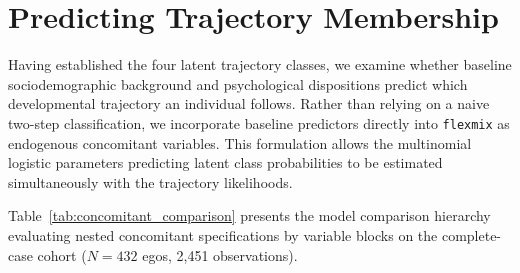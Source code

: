 \documentclass[12pt]{article}
\begin{document}
\section{Predicting Trajectory Membership}

Having established the four latent trajectory classes, we examine whether baseline sociodemographic background and psychological dispositions predict which developmental trajectory an individual follows. Rather than relying on a naive two-step classification, we incorporate baseline predictors directly into \texttt{flexmix} \citep{grun2008flexmix} as endogenous concomitant variables. This formulation allows the multinomial logistic parameters predicting latent class probabilities to be estimated simultaneously with the trajectory likelihoods.

Table~\ref{tab:concomitant_comparison} presents the model comparison hierarchy evaluating nested concomitant specifications by variable blocks on the complete-case cohort ($N = 432$ egos, 2,451 observations).
\end{document}

